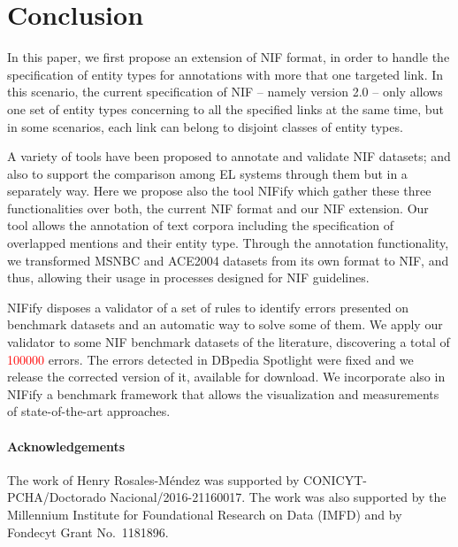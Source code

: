\documentclass{llncs}
\begin{document}
\section{Conclusion} 
\label{sec:conclusion}
In this paper, we first propose an extension of NIF format, in order to handle the specification of entity types for annotations with more that one targeted link. In this scenario, the current specification of NIF -- namely version 2.0 -- only allows one set of entity types concerning to all the specified links at the same time, but in some scenarios, each link can belong to disjoint classes of entity types. 

A variety of tools have been proposed to annotate and validate NIF datasets; and also to support the comparison among EL systems through them but in a separately way. Here we propose also the tool NIFify which gather these three functionalities over both, the current NIF format and our NIF extension. Our tool allows the annotation of text corpora including the specification of overlapped mentions and their entity type. Through the annotation functionality, we transformed MSNBC and ACE2004 datasets from its own format to NIF, and thus, allowing their usage in processes designed for NIF guidelines.

NIFify disposes a validator of a set of rules to identify errors presented on benchmark datasets and an automatic way to solve some of them. We apply our validator to some NIF benchmark datasets of the literature, discovering a total of \textcolor{red}{100000} errors. The errors detected in DBpedia Spotlight were fixed and we release the corrected version of it, available for download. We incorporate also in NIFify a benchmark framework that allows the visualization and measurements of state-of-the-art approaches.




{\footnotesize
\paragraph{Acknowledgements} The work of Henry Rosales-M\'endez was supported by CONICYT-PCHA/Doctorado Nacional/2016-21160017. The work was also supported by the Millennium Institute for Foundational Research on Data (IMFD) and by Fondecyt Grant No.\ 1181896.}

%


\end{document}
